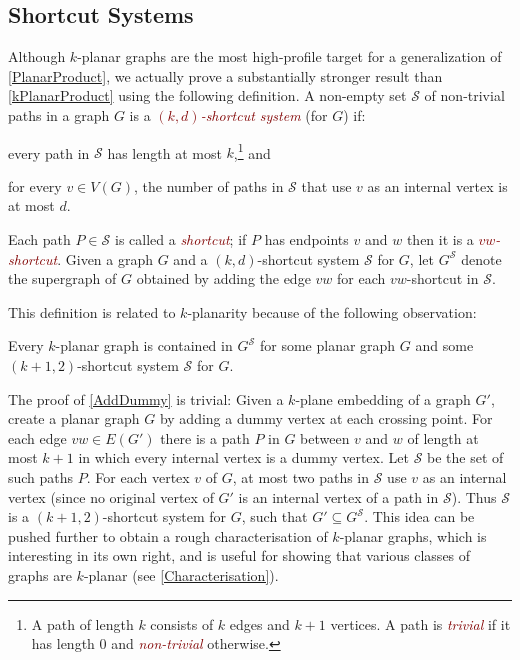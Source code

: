 \documentclass{patmorin}
\newcommand{\defin}[1]{\textcolor{Maroon}{\emph{#1}}}
\renewcommand{\SS}{\mathcal{S}}
\begin{document}
\subsection{Shortcut Systems}

Although $k$-planar graphs are the most high-profile target for a generalization of \cref{PlanarProduct}, we actually prove a substantially stronger result than \cref{kPlanarProduct} using the following definition. A non-empty set $\SS$ of non-trivial paths in a graph $G$ is a \defin{$(k,d)$-shortcut system} (for $G$) if:

\begin{compactitem}
\item every path in $\SS$ has length at most $k$,\footnote{A path of length $k$ consists of $k$ edges and $k+1$ vertices.  A path is \defin{trivial} if it has length 0 and \defin{non-trivial} otherwise.} and
\item for every $v\in V(G)$, the number of paths in $\SS$ that use $v$ as an internal vertex is at most $d$.
\end{compactitem}
Each path $P\in\SS$ is called a \defin{shortcut}; if $P$ has endpoints $v$ and $w$ then it is a \defin{$vw$-shortcut}. Given a graph $G$ and a $(k,d)$-shortcut system $\SS$ for $G$, let $G^{\SS}$ denote the supergraph of $G$ obtained by adding the edge $vw$ for each $vw$-shortcut in $\SS$.

This definition is related to $k$-planarity because of the following observation:

\begin{obs}
\label{AddDummy}
Every $k$-planar graph is contained in $G^\SS$ for some planar graph $G$ and some $(k+1,2)$-shortcut system $\SS$ for $G$.
\end{obs}

The proof of \cref{AddDummy} is trivial: Given a $k$-plane embedding of a graph $G'$, create a planar graph $G$ by adding a dummy vertex at each crossing point. For each edge $vw\in E(G')$ there is a path $P$ in $G$ between $v$ and $w$ of length at most $k+1$ in which every internal vertex is a dummy vertex. Let $\SS$ be the set of such paths $P$. For each vertex $v$ of $G$, at most two paths in $\SS$ use $v$ as an internal vertex (since no original vertex of $G'$ is an internal vertex of a path in $\SS$). Thus $\SS$ is a $(k+1,2)$-shortcut system for $G$, such that $G'\subseteq G^\SS$. This idea can be pushed further to obtain a rough characterisation of $k$-planar graphs, which is interesting in its own right, and is useful for showing that various classes of graphs are $k$-planar (see \cref{Characterisation}).
\end{document}

